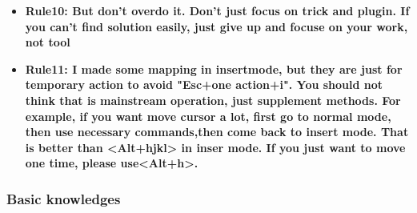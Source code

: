 \documentclass[a4paper,12pt,twoside]{book}
\begin{document}
\begin{itemize}
		\item \textbf{Rule10: But don't overdo it. Don't just focus on trick and plugin. If you can't find solution easily, just give up and focuse on your work, not tool}

		\item \textbf{Rule11: I made some mapping in insertmode, but they are just for temporary action to avoid "Esc+one action+i". You should not think that is mainstream operation, just supplement methods. For example, if you want move cursor a lot, first go to normal mode, then use necessary commands,then come back to insert mode. That is better than <Alt+hjkl> in inser mode. If you just want to move one time, please use<Alt+h>.}
\end{itemize}

\subsubsection{Basic knowledges}
\end{document}
